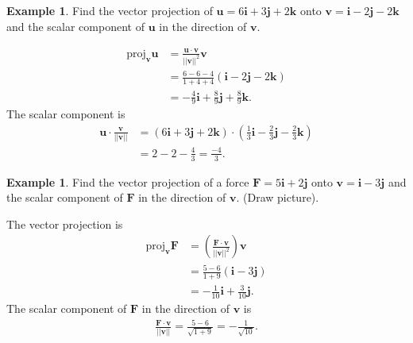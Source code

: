 \documentclass[12pt, letter]{article}
\theoremstyle{plain}
\numberwithin{theorem}{section}
\theoremstyle{definition}
\newtheorem{example}[theorem]{Example}
\begin{document}
\begin{example}
Find the vector projection of $\bm{u} = 6\bm{i} +3\bm{j} + 2\bm{k}$ onto $\bm{v} = \bm{i}-2\bm{j} - 2\bm{k}$ and the scalar component of $\bm{u}$ in the direction of $\bm{v}$.\\

\smallskip

\begin{align*}
\text{proj}_{\bm{v}} \bm{u} &= \frac{\bm{u}\cdot\bm{v}}{||\bm{v}||^2} \bm{v}\\
&= \frac{6-6-4}{1+4+4} (\bm{i}-2\bm{j}-2\bm{k})\\
&= -\frac{4}{9} \bm{i} + \frac{8}{9}\bm{j} + \frac{8}{9} \bm{k}.
\end{align*}
The scalar component is
\begin{align*}
\bm{u} \cdot \frac{\bm{v}}{||\bm{v}||} &= (6\bm{i} +3\bm{j} + 2\bm{k}) \cdot \left(\frac{1}{3}\bm{i} - \frac{2}{3}\bm{j}-\frac{2}{3}\bm{k}\right)\\
&= 2-2-\frac{4}{3} = \frac{-4}{3}.
\end{align*}
\end{example}

\bigskip

\hrulefill

\bigskip

\begin{example}
Find the vector projection of a force $\bm{F} = 5\bm{i}+2\bm{j}$ onto $\bm{v} = \bm{i}-3\bm{j}$ and the scalar component of $\bm{F}$ in the direction of $\bm{v}$. (Draw picture).\\

\smallskip

The vector projection is
\begin{align*}
\text{proj}_{\bm{v}} \bm{F} &= \left(\frac{\bm{F}\cdot\bm{v}}{||\bm{v}||^2}\right) \bm{v}\\
&= \frac{5-6}{1+9} (\bm{i}-3\bm{j})\\
&= -\frac{1}{10}\bm{i} + \frac{3}{10}\bm{j}.
\end{align*}
The scalar component of $\bm{F}$ in the direction of $\bm{v}$ is
\begin{align*}
\frac{\bm{F}\cdot\bm{v}}{||\bm{v}||} = \frac{5-6}{\sqrt{1+9}} = -\frac{1}{\sqrt{10}}.
\end{align*}
\end{example}

\newpage

\end{document}
